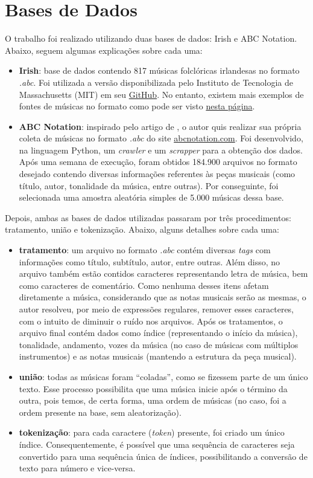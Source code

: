 \documentclass{automatextcc}
\begin{document}
\section{Bases de Dados}
O trabalho foi realizado utilizando duas bases de dados: Irish e ABC Notation. Abaixo, seguem algumas explicações sobre cada uma:
\begin{itemize}
    \item \textbf{Irish}: base de dados contendo 817 músicas folclóricas irlandesas no formato \textit{.abc}. Foi utilizada a versão disponibilizada pelo Instituto de Tecnologia de Massachusetts (MIT) em seu \href{https://github.com/aamini/introtodeeplearning/blob/master/mitdeeplearning/data/irish.abc}{GitHub}. No entanto, existem mais exemplos de fontes de músicas no formato como pode ser visto \href{https://www.norbeck.nu/abc/links.asp}{nesta página}.
    \item \textbf{ABC Notation}: inspirado pelo artigo de \citet{agarwala2017}, o autor quis realizar sua própria coleta de músicas no formato \textit{.abc} do site \href{https://abcnotation.com/}{abcnotation.com}. Foi desenvolvido, na linguagem Python, um \textit{crawler} e um \textit{scrapper} para a obtenção dos dados. Após uma semana de execução, foram obtidos 184.900 arquivos no formato desejado contendo diversas informações referentes às peças musicais (como título, autor, tonalidade da música, entre outras). Por conseguinte, foi selecionada uma amostra aleatória simples de 5.000 músicas dessa base.
\end{itemize}
Depois, ambas as bases de dados utilizadas passaram por três procedimentos: tratamento, união e tokenização. Abaixo, alguns detalhes sobre cada uma:
\begin{itemize}
    \item \textbf{tratamento}: um arquivo no formato \textit{.abc} contém diversas \textit{tags} com informações como título, subtítulo, autor, entre outras. Além disso, no arquivo também estão contidos caracteres representando letra de música, bem como caracteres de comentário. Como nenhuma desses itens afetam diretamente a música, considerando que as notas musicais serão as mesmas, o autor resolveu, por meio de expressões regulares, remover esses caracteres, com o intuito de diminuir o ruído nos arquivos. Após os tratamentos, o arquivo final contém dados como índice (representando o início da música), tonalidade, andamento, vozes da música (no caso de músicas com múltiplos instrumentos) e as notas musicais (mantendo a estrutura da peça musical).
    \item \textbf{união}: todas as músicas foram ``coladas'', como se fizessem parte de um único texto. Esse processo possibilita que uma música inicie após o término da outra, pois temos, de certa forma, uma ordem de músicas (no caso, foi a ordem presente na base, sem aleatorização).
    \item \textbf{tokenização}: para cada caractere (\textit{token}) presente, foi criado um único índice. Consequentemente, é possível que uma sequência de caracteres seja convertido para uma sequência única de índices, possibilitando a conversão de texto para número e vice-versa.
\end{itemize}
\end{document}
